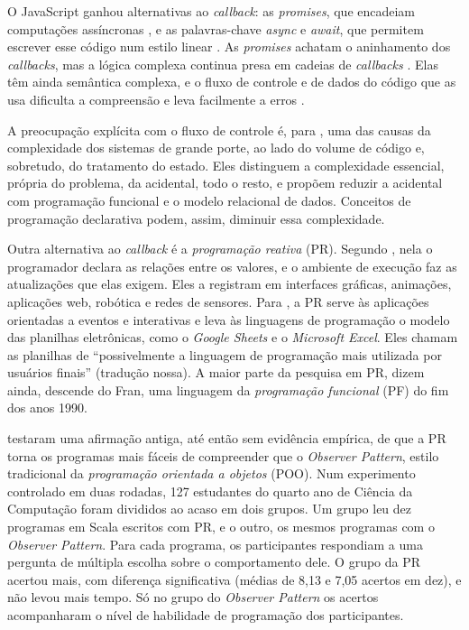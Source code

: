 O JavaScript ganhou alternativas ao \emph{callback}: as \emph{promises}, que encadeiam
computações assíncronas \cite{madsen2017}, e as palavras-chave \emph{async} e
\emph{await}, que permitem escrever esse código num estilo linear
\cite[p. 362]{gallaba2017}.
As \emph{promises} achatam o aninhamento dos \emph{callbacks}, mas a lógica complexa
continua presa em cadeias de \emph{callbacks} \cite[p. 9]{grolaux2026}.
Elas têm ainda semântica complexa, e o fluxo de controle e de dados do
código que as usa dificulta a compreensão e leva facilmente a erros
\cite[p. 162:1]{alimadadi2018}.

A preocupação explícita com o fluxo de controle é, para
\textcite[p. 1 e 21]{moseley2006}, uma das causas da complexidade dos
sistemas de grande porte, ao lado do volume de código e, sobretudo, do
tratamento do estado.
Eles distinguem a complexidade essencial, própria do problema, da acidental,
todo o resto, e propõem reduzir a acidental com programação funcional e o
modelo relacional de dados.
Conceitos de programação declarativa podem, assim, diminuir essa complexidade.

Outra alternativa ao \emph{callback} é a \emph{programação reativa} (PR).
Segundo \textcite[p. 1125-1126]{salvaneschi2017}, nela o programador
declara as relações entre os valores, e o ambiente de execução faz as
atualizações que elas exigem.
Eles a registram em interfaces gráficas, animações, aplicações web, robótica
e redes de sensores.
Para \textcite[p. 1-2]{bainomugisha2013}, a PR serve às aplicações
orientadas a eventos e interativas e leva às linguagens de programação o
modelo das planilhas eletrônicas, como o \emph{Google Sheets} e o \emph{Microsoft
Excel}.
Eles chamam as planilhas de “possivelmente a linguagem de programação mais
utilizada por usuários finais” (tradução nossa).
A maior parte da pesquisa em PR, dizem ainda, descende do Fran, uma
linguagem da \emph{programação funcional} (PF) do fim dos anos 1990.

\textcite[p. 1125-1134]{salvaneschi2017} testaram uma afirmação antiga,
até então sem evidência empírica, de que a PR torna os programas mais fáceis
de compreender que o \emph{Observer Pattern}, estilo tradicional da \emph{programação
orientada a objetos} (POO).
Num experimento controlado em duas rodadas, 127 estudantes do quarto ano de Ciência da Computação
foram divididos ao acaso em dois grupos.
Um grupo leu dez programas em Scala escritos com PR, e o outro, os mesmos
programas com o \emph{Observer Pattern}.
Para cada programa, os participantes respondiam a uma pergunta de múltipla
escolha sobre o comportamento dele.
O grupo da PR acertou mais, com diferença significativa (médias de 8,13 e
7,05 acertos em dez), e não levou mais tempo.
Só no grupo do \emph{Observer Pattern} os acertos acompanharam o nível de
habilidade de programação dos participantes.

